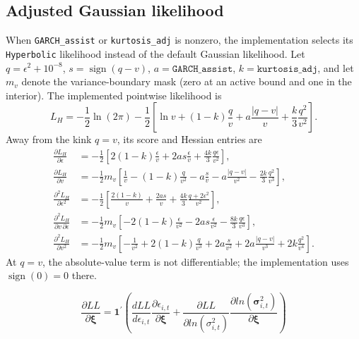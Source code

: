 \documentclass[12pt]{article}
\begin{document}
\subsection{Adjusted Gaussian likelihood}
When \texttt{GARCH\_assist} or \texttt{kurtosis\_adj} is nonzero, the implementation selects its \texttt{Hyperbolic} likelihood instead of the default Gaussian likelihood. Let $q=\epsilon^{2}+10^{-8}$, $s=\operatorname{sign}(q-v)$, $a=\texttt{GARCH\_assist}$, $k=\texttt{kurtosis\_adj}$, and let $m_v$ denote the variance-boundary mask (zero at an active bound and one in the interior). The implemented pointwise likelihood is
\begin{equation}
L_H=-\frac{1}{2}\ln(2\pi)-\frac{1}{2}\left[\ln v+(1-k)\frac{q}{v}+a\frac{|q-v|}{v}+\frac{k}{3}\frac{q^{2}}{v^{2}}\right].
\label{eq:hyperbolic-ll}
\end{equation}
Away from the kink $q=v$, its score and Hessian entries are
\begin{align}
\frac{\partial L_H}{\partial\epsilon}
&=-\frac{1}{2}\left[2(1-k)\frac{\epsilon}{v}+2as\frac{\epsilon}{v}+\frac{4k}{3}\frac{q\epsilon}{v^{2}}\right],
\label{eq:hyperbolic-score-e}\\
\frac{\partial L_H}{\partial v}
&=-\frac{1}{2}m_v\left[\frac{1}{v}-(1-k)\frac{q}{v^{2}}-a\frac{s}{v}-a\frac{|q-v|}{v^{2}}-\frac{2k}{3}\frac{q^{2}}{v^{3}}\right],
\label{eq:hyperbolic-score-v}\\
\frac{\partial^{2}L_H}{\partial\epsilon^{2}}
&=-\frac{1}{2}\left[\frac{2(1-k)}{v}+\frac{2as}{v}+\frac{4k}{3}\frac{q+2\epsilon^{2}}{v^{2}}\right],
\label{eq:hyperbolic-hess-ee}\\
\frac{\partial^{2}L_H}{\partial v\,\partial\epsilon}
&=-\frac{1}{2}m_v\left[-2(1-k)\frac{\epsilon}{v^{2}}-2as\frac{\epsilon}{v^{2}}-\frac{8k}{3}\frac{q\epsilon}{v^{3}}\right],
\label{eq:hyperbolic-hess-ve}\\
\frac{\partial^{2}L_H}{\partial v^{2}}
&=-\frac{1}{2}m_v\left[-\frac{1}{v^{2}}+2(1-k)\frac{q}{v^{3}}+2a\frac{s}{v^{2}}+2a\frac{|q-v|}{v^{3}}+2k\frac{q^{2}}{v^{4}}\right].
\label{eq:hyperbolic-hess-vv}
\end{align}
At $q=v$, the absolute-value term is not differentiable; the implementation uses $\operatorname{sign}(0)=0$ there.


\begin{equation}
\frac{\partial LL}{\partial\mathbf{\xi}} = \mathbf{1}^{'}\left(\frac{dLL}{d\epsilon_{i,t}}\frac{\partial\epsilon_{i,t}}{\partial\mathbf{\xi}} + \frac{\partial LL}{{\partial ln}\left( \sigma_{i,t}^{2} \right)}\frac{{\partial ln}\left( \mathbf{\sigma}_{i,t}^{2} \right)}{\partial\mathbf{\xi}} \right)
\label{eq:57}
\end{equation}
\end{document}

